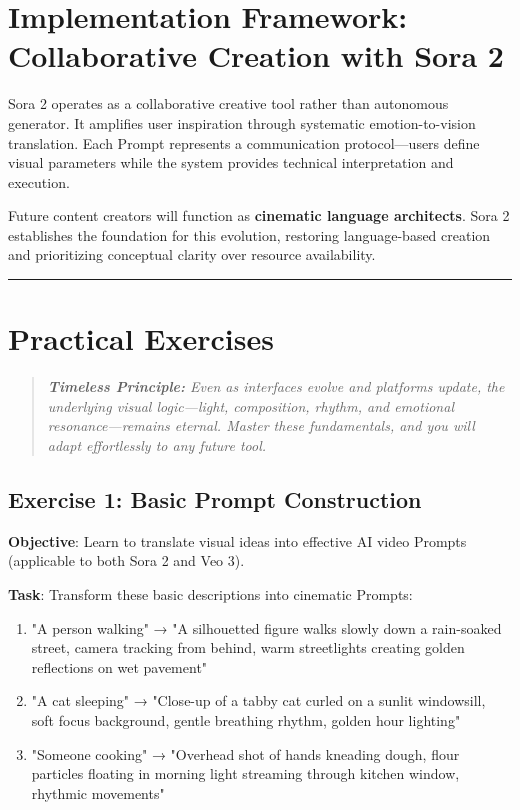 \section{Implementation Framework: Collaborative Creation with Sora 2}

Sora 2 operates as a collaborative creative tool rather than autonomous generator. It amplifies user inspiration through systematic emotion-to-vision translation. Each Prompt represents a communication protocol---users define visual parameters while the system provides technical interpretation and execution.

Future content creators will function as \textbf{cinematic language architects}. Sora 2 establishes the foundation for this evolution, restoring language-based creation and prioritizing conceptual clarity over resource availability.

\vspace{1em}
\hrule
\vspace{1em}

\section*{Practical Exercises}

\begin{quote}
\textit{\textbf{Timeless Principle:} Even as interfaces evolve and platforms update, the underlying visual logic---light, composition, rhythm, and emotional resonance---remains eternal. Master these fundamentals, and you will adapt effortlessly to any future tool.}
\end{quote}

\subsection*{Exercise 1: Basic Prompt Construction}
\textbf{Objective}: Learn to translate visual ideas into effective AI video Prompts (applicable to both Sora 2 and Veo 3).

\textbf{Task}: Transform these basic descriptions into cinematic Prompts:
\begin{enumerate}
\item "A person walking" → "A silhouetted figure walks slowly down a rain-soaked street, camera tracking from behind, warm streetlights creating golden reflections on wet pavement"
\item "A cat sleeping" → "Close-up of a tabby cat curled on a sunlit windowsill, soft focus background, gentle breathing rhythm, golden hour lighting"
\item "Someone cooking" → "Overhead shot of hands kneading dough, flour particles floating in morning light streaming through kitchen window, rhythmic movements"
\end{enumerate}

